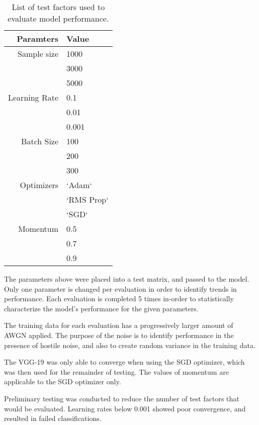 		\begin{table}[htbp!]
			\begin{center}
				\caption[Hyperparameter test factors]{List of test factors used to evaluate model performance.}
				\label{tab:corrs}
				\begin{tabular}{|r|l|}
					\hline
					\textbf{Paramters} & \textbf{Value}\\
					\hline
					Sample size	&	1000 \\
											& 3000 \\
											& 5000 \\
					\hline
					Learning Rate	& 0.1 \\
												& 0.01 \\
												& 0.001 \\
					\hline
					Batch Size	&	100 \\
											& 200 \\
											& 300 \\
					\hline
					Optimizers	& `Adam` \\
											& `RMS Prop`\\
											& `SGD` \\
					\hline
					Momentum 	& 0.5 \\
										& 0.7 \\
										& 0.9 \\
					\hline
				\end{tabular}
			\end{center}
		\end{table}



		The parameters above were placed into a test matrix, and passed to the model. Only one parameter is changed per evaluation in order to identify trends in performance. Each evaluation is completed 5 times in-order to statistically characterize the model's performance for the given parameters.

		The training data for each evaluation has a progressively larger amount of AWGN applied. The purpose of the noise is to identify performance in the presence of hostile noise, and also to create random variance in the training data.

		The VGG-19 was only able to converge when using the SGD optimizer, which was then used for the remainder of testing. The values of momentum are applicable to the SGD optimizer only.

		Preliminary testing was conducted to reduce the number of test factors that would be evaluated. Learning rates below 0.001 showed poor convergence, and resulted in failed classifications.
